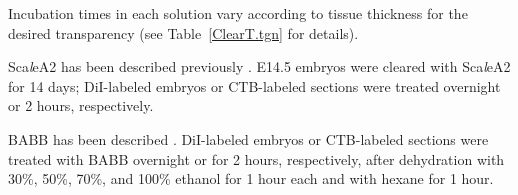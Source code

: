 Incubation times in each solution vary according to tissue thickness for the desired transparency (see Table~\ref{ClearT.tgn} for details).

Sca\emph{l}eA2 has been described previously \cite{hama2011scale}.
E14.5 embryos were cleared with Sca\emph{l}eA2 for 14 days; DiI-labeled embryos or CTB-labeled sections were treated overnight or 2 hours, respectively.

BABB has been described \cite{dodt2007ultramicroscopy}.
DiI-labeled embryos or CTB-labeled sections were treated with BABB overnight or for 2 hours, respectively, after dehydration with 30\%, 50\%, 70\%, and 100\% ethanol for 1 hour each and with hexane for 1 hour.
